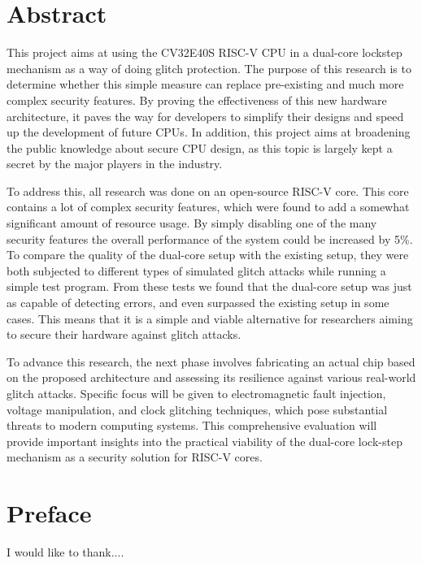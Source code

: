 \chapter{Abstract}

This project aims at using the CV32E40S RISC-V CPU in a dual-core lockstep mechanism as a way of doing glitch protection. The purpose of this research is to determine whether this simple measure can replace pre-existing and much more complex security features. By proving the effectiveness of this new hardware architecture, it paves the way for developers to simplify their designs and speed up the development of future CPUs. In addition, this project aims at broadening the public knowledge about secure CPU design, as this topic is largely kept a secret by the major players in the industry. 

To address this, all research was done on an open-source RISC-V core. This core contains a lot of complex security features, which were found to add a somewhat significant amount of resource usage. By simply disabling one of the many security features the overall performance of the system could be increased by 5\%. To compare the quality of the dual-core setup with the existing setup, they were both subjected to different types of simulated glitch attacks while running a simple test program. From these tests we found that the dual-core setup was just as capable of detecting errors, and even surpassed the existing setup in some cases. This means that it is a simple and viable alternative for researchers aiming to secure their hardware against glitch attacks. 

To advance this research, the next phase involves fabricating an actual chip based on the proposed architecture and assessing its resilience against various real-world glitch attacks. Specific focus will be given to electromagnetic fault injection, voltage manipulation, and clock glitching techniques, which pose substantial threats to modern computing systems. This comprehensive evaluation will provide important insights into the practical viability of the dual-core lock-step mechanism as a security solution for RISC-V cores.

\chapter{Preface}
I would like to thank....

